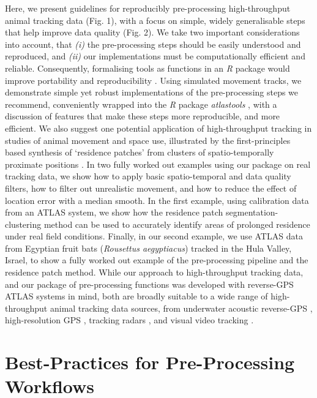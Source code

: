 \begin{refsection}
    Here, we present guidelines for reproducibly pre-processing high-throughput animal tracking data (Fig. 1), with a focus on simple, widely generalisable steps that help improve data quality (Fig. 2).
    We take two important considerations into account, that \textit{(i)} the pre-processing steps should be easily understood and reproduced, and \textit{(ii)} our implementations must be computationally efficient and reliable.
    Consequently, formalising tools as functions in an \textit{R} package would improve portability and reproducibility \cite{marwick2018, wickham2015}.
    Using simulated movement tracks, we demonstrate simple yet robust implementations of the pre-processing steps we recommend, conveniently wrapped into the \textit{R} package \textit{atlastools} \cite{gupte2020a}, with a discussion of features that make these steps more reproducible, and more efficient.
    We also suggest one potential application of high-throughput tracking in studies of animal movement and space use, illustrated by the first-principles based synthesis of `residence patches' from clusters of spatio-temporally proximate positions \cite[\textit{sensu}][]{bijleveld2016, oudman2018, barraquand2008}.
    In two fully worked out examples using our package on real tracking data, we show how to apply basic spatio-temporal and data quality filters, how to filter out unrealistic movement, and how to reduce the effect of location error with a median smooth.
    In the first example, using calibration data from an ATLAS system, we show how the residence patch segmentation-clustering method can be used to accurately identify areas of prolonged residence under real field conditions.
    Finally, in our second example, we use ATLAS data from Egyptian fruit bats (\textit{Rousettus aegyptiacus}) tracked in the Hula Valley, Israel, to show a fully worked out example of the pre-processing pipeline and the residence patch method.
    While our approach to high-throughput tracking data, and our package of pre-processing functions was developed with reverse-GPS ATLAS systems in mind, both are broadly suitable to a wide range of high-throughput animal tracking data sources, from underwater acoustic reverse-GPS \cite{baktoft2019, baktoft2017, jung2015, aspillaga2021, aspillaga2021a}, high-resolution GPS \cite{strandburg-peshkin2015, papageorgiou2019, harel2016, klarevas-irby2021}, tracking radars \cite{horvitz2014}, and visual video tracking \cite{rathore2020, perez-escudero2014}.

    \section{Best-Practices for Pre-Processing Workflows}


\end{refsection}
